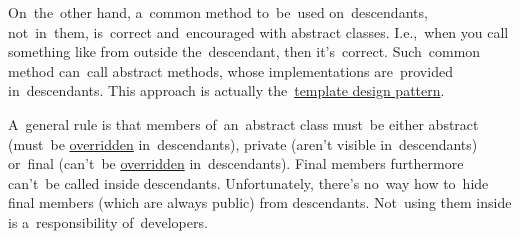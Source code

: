On~the~other hand, a~common method to~be~used on~descendants, not~in~them, is~correct and~encouraged with abstract classes.
I.e.,~when you call something like  from outside the~descendant, then it's~correct.
Such~common method can~call abstract methods, whose implementations are~provided in~descendants.
This approach is actually the~\hyperref[templatedp]{template design pattern}.

A~general rule is that members of~an~abstract class must~be either abstract (must~be \hyperref[javaoverride]{overridden} in~descendants), private (aren't visible in~descendants) or~final (can't~be \hyperref[javaoverride]{overridden} in~descendants).
Final members furthermore can't~be called inside descendants.
Unfortunately, there's no~way how to~hide final members (which are always public) from descendants.
Not~using them inside is a~responsibility of~developers.
\newpage

